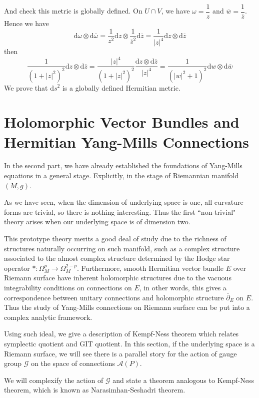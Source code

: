 \documentclass[11pt]{amsart}
\numberwithin{equation}{section}
\theoremstyle{plain}
\theoremstyle{plain}
\numberwithin{equation}{section}
\begin{document}
And check this metric is globally defined. On $U\cap V$, we have $\omega=\dfrac1z$ and $\overline{w}=\dfrac{1}{\overline{z}}$. Hence we have
$$
\mathrm{d}\omega\otimes\mathrm{d}\overline{\omega}=\frac{1}{z^2}\mathrm{d}z\otimes\frac{1}{\overline{z}^2}\mathrm{d}\overline{z}=\frac{1}{|z|^4}\mathrm{d}z\otimes\mathrm{d}\overline{z}
$$
then
$$
\frac{1}{(1+|z|^{2})^{2}} \mathrm{d} z \otimes \mathrm{d} \overline{z}=\frac{|z|^{4}}{(1+|z|^{2})^{2}} \frac{\mathrm{d} z \otimes \mathrm{d} \overline{z}}{|z|^{4}}=\frac{1}{(|w|^{2}+1)^{2}} \mathrm{d}w \otimes \mathrm{d} \overline{w}
$$
We prove that $\mathrm{d}s^2$ is a globally defined Hermitian metric.

\section{Holomorphic Vector Bundles and Hermitian Yang-Mills Connections}
In the second part, we have already established the foundations of Yang-Mills equations in a general stage. Explicitly, in the stage of Riemannian manifold $(M,g)$.

As we have seen, when the dimension of underlying space is one, all curvature forms are trivial, so there is nothing interesting. Thus the first “non-trivial" theory arises when our underlying space is of dimension two. 

This prototype theory merits a good deal of study due to the richness of structures naturally occurring on such manifold, such as a complex structure associated to the almost complex structure determined by the Hodge star operator $*:\Omega_M^p\to\Omega_M^{2-p}$. Furthermore, smooth Hermitian vector bundle $E$ over Riemann surface have inherent holomorphic structures due to the vacuous integrability conditions on connections on $E$, in other words, this gives a correspondence between unitary connections and holomorphic structure $\overline{\partial}_E$ on $E$. Thus the study of Yang-Mills connections on Riemann surface can be put into a complex analytic framework. 

Using such ideal, we give a description of Kempf-Ness theorem which relates symplectic quotient and GIT quotient. In this section, if the underlying space is a Riemann surface, we will see there is a parallel story for the action of gauge group $\mathscr{G}$ on the space of connections $\mathscr{A}(P)$.

 We will complexify the action of $\mathscr{G}$ and state a theorem analogous to Kempf-Ness theorem, which is known as Narasimhan-Seshadri theorem.
\end{document}
